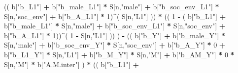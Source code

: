 \documentclass[
]{book}
\newenvironment{Shaded}{\begin{snugshade}}{\end{snugshade}}
\newcommand{\DecValTok}[1]{\textcolor[rgb]{0.00,0.00,0.81}{#1}}
\newcommand{\NormalTok}[1]{#1}
\newcommand{\SpecialCharTok}[1]{\textcolor[rgb]{0.81,0.36,0.00}{\textbf{#1}}}
\newcommand{\StringTok}[1]{\textcolor[rgb]{0.31,0.60,0.02}{#1}}
\begin{document}
\begin{Shaded}
\begin{Highlighting}[]
\NormalTok{                      (( b[}\StringTok{"b\_L1"}\NormalTok{] }\SpecialCharTok{+}
\NormalTok{                           b[}\StringTok{"b\_male\_L1"}\NormalTok{] }\SpecialCharTok{*}\NormalTok{ S[n,}\StringTok{"male"}\NormalTok{] }\SpecialCharTok{+}  
\NormalTok{                           b[}\StringTok{"b\_soc\_env\_L1"}\NormalTok{] }\SpecialCharTok{*}\NormalTok{ S[n,}\StringTok{"soc\_env"}\NormalTok{] }\SpecialCharTok{+}
\NormalTok{                           b[}\StringTok{"b\_A\_L1"}\NormalTok{] }\SpecialCharTok{*} \DecValTok{1}\NormalTok{)}\SpecialCharTok{\^{}}\NormalTok{( S[n,}\StringTok{"L1"}\NormalTok{] )) }\SpecialCharTok{*}
\NormalTok{                      (( }\DecValTok{1} \SpecialCharTok{{-}}\NormalTok{ ( b[}\StringTok{"b\_L1"}\NormalTok{] }\SpecialCharTok{+}
\NormalTok{                                 b[}\StringTok{"b\_male\_L1"}\NormalTok{] }\SpecialCharTok{*}\NormalTok{ S[n,}\StringTok{"male"}\NormalTok{] }\SpecialCharTok{+}  
\NormalTok{                                 b[}\StringTok{"b\_soc\_env\_L1"}\NormalTok{] }\SpecialCharTok{*}\NormalTok{ S[n,}\StringTok{"soc\_env"}\NormalTok{] }\SpecialCharTok{+}
\NormalTok{                                 b[}\StringTok{"b\_A\_L1"}\NormalTok{] }\SpecialCharTok{*} \DecValTok{1}\NormalTok{))}\SpecialCharTok{\^{}}\NormalTok{( }\DecValTok{1} \SpecialCharTok{{-}}\NormalTok{ S[n,}\StringTok{"L1"}\NormalTok{] )) ) }\SpecialCharTok{{-}} 
\NormalTok{                      (( b[}\StringTok{"b\_Y"}\NormalTok{] }\SpecialCharTok{+} 
\NormalTok{                          b[}\StringTok{"b\_male\_Y"}\NormalTok{] }\SpecialCharTok{*}\NormalTok{ S[n,}\StringTok{"male"}\NormalTok{] }\SpecialCharTok{+} 
\NormalTok{                          b[}\StringTok{"b\_soc\_env\_Y"}\NormalTok{] }\SpecialCharTok{*}\NormalTok{ S[n,}\StringTok{"soc\_env"}\NormalTok{] }\SpecialCharTok{+} 
\NormalTok{                          b[}\StringTok{"b\_A\_Y"}\NormalTok{] }\SpecialCharTok{*} \DecValTok{0} \SpecialCharTok{+} 
\NormalTok{                          b[}\StringTok{"b\_L1\_Y"}\NormalTok{] }\SpecialCharTok{*}\NormalTok{ S[n,}\StringTok{"L1"}\NormalTok{] }\SpecialCharTok{+}
\NormalTok{                          b[}\StringTok{"b\_M\_Y"}\NormalTok{] }\SpecialCharTok{*}\NormalTok{ S[n,}\StringTok{"M"}\NormalTok{] }\SpecialCharTok{+}
\NormalTok{                          b[}\StringTok{"b\_AM\_Y"}\NormalTok{] }\SpecialCharTok{*} \DecValTok{0} \SpecialCharTok{*}\NormalTok{ S[n,}\StringTok{"M"}\NormalTok{] }\SpecialCharTok{*}\NormalTok{ b[}\StringTok{"A.M.inter"}\NormalTok{] ) }\SpecialCharTok{*}
\NormalTok{                      (( b[}\StringTok{"b\_L1"}\NormalTok{] }\SpecialCharTok{+}

\end{Highlighting}
\end{Shaded}
\end{document}
